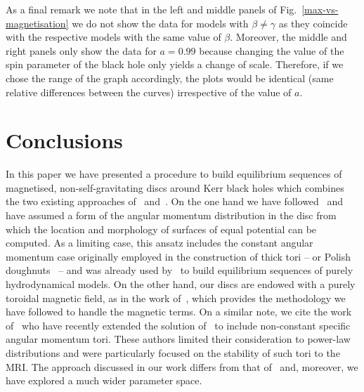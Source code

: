\documentclass[referee]{aa}
\begin{document}
As a final remark we note that in the left and middle panels of Fig.~\ref{max-vs-magnetisation} we do not show the data for models with $\beta \neq \gamma$ as they coincide with the respective models with the same value of $\beta$. Moreover, the middle and right panels only show the data for $a=0.99$ because changing the value of the spin parameter of the black hole only yields a change of scale. Therefore, if we chose the range of the graph accordingly, the plots would be identical (same relative differences between the curves) irrespective of the value of $a$.

\section{Conclusions}
\label{conclusions}

In this paper we have presented a procedure to build equilibrium sequences of magnetised, non-self-gravitating discs around Kerr black holes which combines the two existing approaches of~\citet{Komissarov:2006} and~\citet{Qian:2009}. On the one hand we have followed~\citet{Qian:2009} and have assumed a form of the angular momentum distribution in the disc from which the location and morphology of surfaces of equal potential can be computed. As a limiting case, this ansatz includes the constant angular momentum case originally employed in the construction of thick tori -- or Polish doughnuts~\citep{Abramowicz:1978,Kozlowski:1978}  -- and was already used by~\citet{Qian:2009} to build equilibrium sequences of purely hydrodynamical models. On the other hand, our discs are endowed with a purely toroidal magnetic field, as in the work of~\citet{Komissarov:2006}, which provides the methodology we have followed to handle the magnetic terms. On a similar note, we cite the work of~\citet{Wielgus:2015} who have recently extended the solution of~\citet{Komissarov:2006} to include non-constant specific angular momentum tori. These authors  limited their consideration to power-law distributions and were particularly focused on the stability of such tori to the MRI. The approach discussed in our work differs from that of~\citet{Wielgus:2015} and, moreover, we have explored a much wider parameter space.
\end{document}
